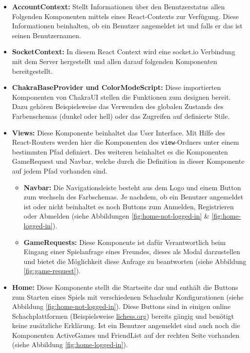 \begin{itemize}
\item \textbf{AccountContext:} Stellt Informationen über den Benutzerstatus allen Folgenden Komponenten mittels eines React-Contexts zur Verfügung. Diese Informationen beinhalten, ob ein Benutzer angemeldet ist und falls er das ist seinen Benutzernamen.
\item \textbf{SocketContext:} In diesem React Context wird eine socket.io Verbindung mit dem Server hergestellt und allen darauf folgenden Komponenten bereitgestellt.
\item \textbf{ChakraBaseProvider und ColorModeScript:} Diese importierten Komponenten von ChakraUI stellen die Funktionen zum designen bereit. Dazu gehören Beispielsweise das Verwenden des globalen Zustands des Farbenschemas (dunkel oder hell) oder das Zugreifen auf definierte Stile.
\item \textbf{Views:} Diese Komponente beinhaltet das User Interface. Mit Hilfe des React-Routers werden hier die Komponenten des \verb|view|-Ordners unter einem bestimmten Pfad definiert. Des weiteren beinhaltet es die Komponenten GameRequest und Navbar, welche durch die Definition in dieser Komponente auf jedem Pfad vorhanden sind.
\begin{itemize}
\item \textbf{Navbar:} Die Navigationsleiste besteht aus dem Logo und einem Button zum wechseln des Farbschemas. Je nachdem, ob ein Benutzer angemeldet ist oder nicht beinhaltet es noch Buttons zum Anmelden, Registrieren oder Abmelden (siehe Abbildungen \ref{fig:home-not-logged-in} \& \ref{fig:home-logged-in}).
\item \textbf{GameRequests:} Diese Komponente ist dafür Verantwortlich beim Eingang einer Spielanfrage eines Freundes, dieses als Modal darzustellen und bietet die Möglichkeit diese Anfrage zu beantworten (siehe Abbildung \ref{fig:game-request}).
\end{itemize}
\item \textbf{Home:} Diese Komponente stellt die Startseite dar und enthält die Buttons zum Starten eines Spiels mit verschiedenen Schachuhr Konfigurationen (siehe Abbildung \ref{fig:home-not-logged-in}). Diese Buttons sind in einigen online Schachplattformen (Beispielsweise \url{lichess.org}) bereits gängig und benötigt keine zusätzliche Erklärung. Ist ein Benutzer angemeldet sind auch noch die Komponenten ActiveGames und FriendList auf der rechten Seite vorhanden (siehe Abbildung \ref{fig:home-logged-in}).
\begin{itemize}

\end{itemize}
\end{itemize}
